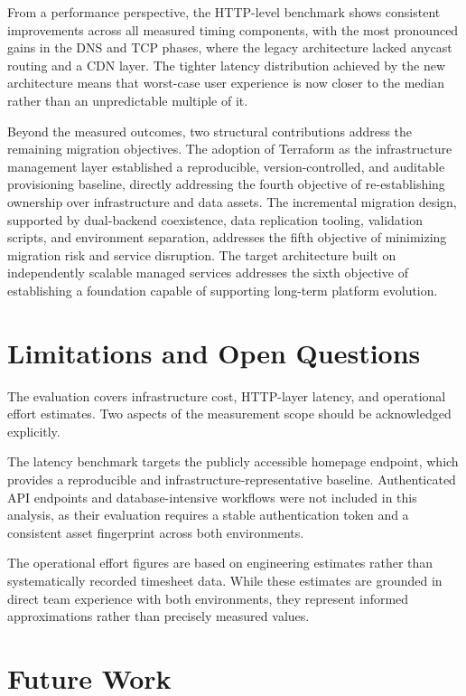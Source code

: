 From a performance perspective, the HTTP-level benchmark shows consistent improvements across all measured timing components, with the most pronounced gains in the DNS and TCP phases, where the legacy architecture lacked anycast routing and a CDN layer. The tighter latency distribution achieved by the new architecture means that worst-case user experience is now closer to the median rather than an unpredictable multiple of it.

Beyond the measured outcomes, two structural contributions address the remaining migration objectives. The adoption of Terraform as the infrastructure management layer established a reproducible, version-controlled, and auditable provisioning baseline, directly addressing the fourth objective of re-establishing ownership over infrastructure and data assets. The incremental migration design, supported by dual-backend coexistence, data replication tooling, validation scripts, and environment separation, addresses the fifth objective of minimizing migration risk and service disruption. The target architecture built on independently scalable managed services addresses the sixth objective of establishing a foundation capable of supporting long-term platform evolution.

\section{Limitations and Open Questions}

The evaluation covers infrastructure cost, HTTP-layer latency, and operational effort estimates. Two aspects of the measurement scope should be acknowledged explicitly.

The latency benchmark targets the publicly accessible homepage endpoint, which provides a reproducible and infrastructure-representative baseline. Authenticated API endpoints and database-intensive workflows were not included in this analysis, as their evaluation requires a stable authentication token and a consistent asset fingerprint across both environments.

The operational effort figures are based on engineering estimates rather than systematically recorded timesheet data. While these estimates are grounded in direct team experience with both environments, they represent informed approximations rather than precisely measured values.

\section{Future Work}

